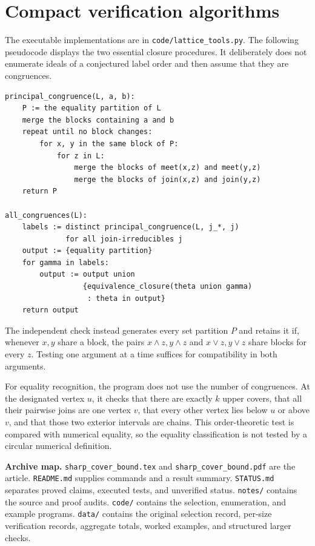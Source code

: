 \documentclass[11pt,a4paper]{article}
\numberwithin{equation}{section}
\theoremstyle{definition}
\theoremstyle{remark}
\begin{document}
\clearpage
\section{Compact verification algorithms}\label{app:algorithms}
The executable implementations are in \texttt{code/lattice\_tools.py}.
The following pseudocode displays the two essential closure procedures.
It deliberately does not enumerate ideals of a conjectured label order and then
assume that they are congruences.

\begin{lstlisting}
principal_congruence(L, a, b):
    P := the equality partition of L
    merge the blocks containing a and b
    repeat until no block changes:
        for x, y in the same block of P:
            for z in L:
                merge the blocks of meet(x,z) and meet(y,z)
                merge the blocks of join(x,z) and join(y,z)
    return P

all_congruences(L):
    labels := distinct principal_congruence(L, j_*, j)
              for all join-irreducibles j
    output := {equality partition}
    for gamma in labels:
        output := output union
                  {equivalence_closure(theta union gamma)
                   : theta in output}
    return output
\end{lstlisting}

The independent check instead generates every set partition $P$ and retains it
if, whenever $x,y$ share a block, the pairs
$x\wedge z,y\wedge z$ and $x\vee z,y\vee z$ share blocks for every $z$.
Testing one argument at a time suffices for compatibility in both arguments.

For equality recognition, the program does not use the number of congruences.
At the designated vertex $u$, it checks that there are exactly $k$ upper covers,
that all their pairwise joins are one vertex $v$, that every other vertex lies
below $u$ or above $v$, and that those two exterior intervals are chains.
This order-theoretic test is compared with numerical equality, so the equality
classification is not tested by a circular numerical definition.

\medskip
\noindent\textbf{Archive map.}
\texttt{sharp\_cover\_bound.tex} and \texttt{sharp\_cover\_bound.pdf} are the article.
\texttt{README.md} supplies commands and a result summary.
\texttt{STATUS.md} separates proved claims, executed tests, and unverified status.
\texttt{notes/} contains the source and proof audits.
\texttt{code/} contains the selection, enumeration, and example programs.
\texttt{data/} contains the original selection record, per-size verification
records, aggregate totals, worked examples, and structured larger checks.
\end{document}
